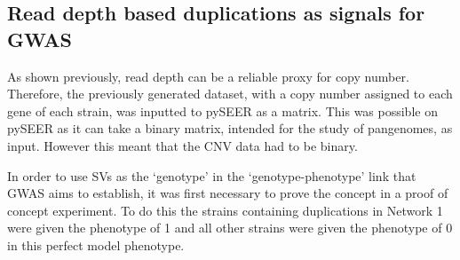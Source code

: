 \documentclass{article}
\begin{document}
\subsection{Read depth based duplications as signals for GWAS}

As shown previously, read depth can be a reliable proxy for copy number. Therefore, the previously generated dataset, with a copy number assigned to each gene of each strain, was inputted to pySEER as a matrix. This was possible on pySEER as it can take a binary matrix, intended for the study of pangenomes, as input. However this meant that the CNV data had to be binary.


In order to use SVs as the ‘genotype’ in the ‘genotype-phenotype’ link that GWAS aims to establish, it was first necessary to prove the concept in a proof of concept experiment. To do this the strains containing duplications in Network 1 were given the phenotype of 1 and all other strains were given the phenotype of 0 in this perfect model phenotype.

%



\end{document}
